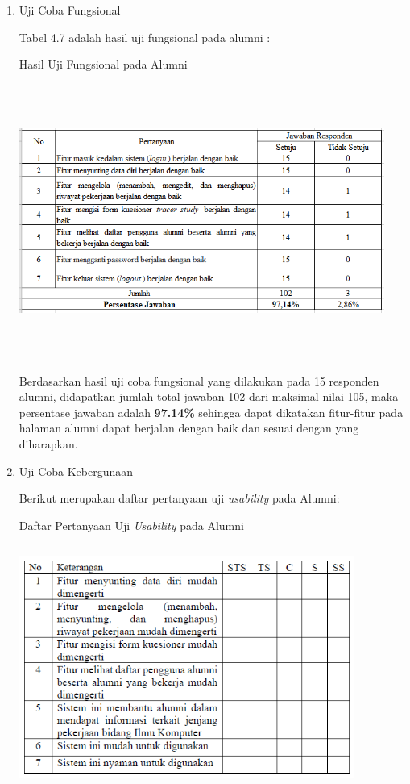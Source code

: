 \begin{enumerate}
	\item Uji Coba Fungsional
	
	Tabel 4.7 adalah hasil uji fungsional pada alumni :
	
	\begin{table}[H]
		\centering
		\caption{Hasil Uji Fungsional pada Alumni}
		\includegraphics[width=12cm,height=9cm]{gambar/UAT/f_alumni}
		\label{f_alumni}
	\end{table}
	
	Berdasarkan hasil uji coba fungsional yang dilakukan pada 15 responden alumni, didapatkan jumlah total jawaban 102 dari maksimal nilai 105, maka persentase jawaban adalah \textbf{97.14\%} sehingga dapat dikatakan fitur-fitur pada halaman alumni dapat berjalan dengan baik dan sesuai dengan yang diharapkan. 
	
	\item Uji Coba Kebergunaan
	
	Berikut merupakan daftar pertanyaan uji \textit{usability} pada Alumni:
	
	\begin{table}[H]
		\centering
		\caption{Daftar Pertanyaan Uji \textit{Usability} pada Alumni}
		\includegraphics[width=11cm,height=8cm]{gambar/UAT/u_alumni}
		\label{u_alumni}
	\end{table}
	

\end{enumerate}
